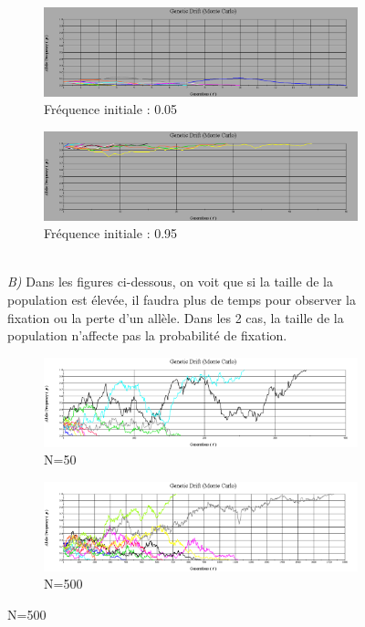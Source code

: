 \documentclass[a4paper]{report}
\begin{document}
\begin{figure}[!h]
	
	\begin{subfigure}{.5\textwidth}
		\centering
		\includegraphics[width=.99\linewidth]{r2.png}
		\caption{Fréquence initiale : 0.05}
	\end{subfigure}%
	\begin{subfigure}{.5\textwidth}
		\centering
		\includegraphics[width=.99\linewidth]{r2_2.png}
		\caption{Fréquence initiale : 0.95}
	\end{subfigure}\\


\textit{B)} Dans les figures ci-dessous, on voit que si la taille de la population est élevée, il faudra plus de temps pour observer la fixation ou la perte d'un allèle. Dans les 2 cas, la taille de la population n'affecte pas la probabilité de fixation. 


	\begin{subfigure}{.5\textwidth}
		\centering
		\includegraphics[width=.99\linewidth]{r3_1.png}
		\caption{N=50}
	\end{subfigure}%
	\begin{subfigure}{.5\textwidth}
		\centering
		\includegraphics[width=.99\linewidth]{r3_2.png}
		\caption{N=500}
	\end{subfigure}



\end{figure}
\end{document}
